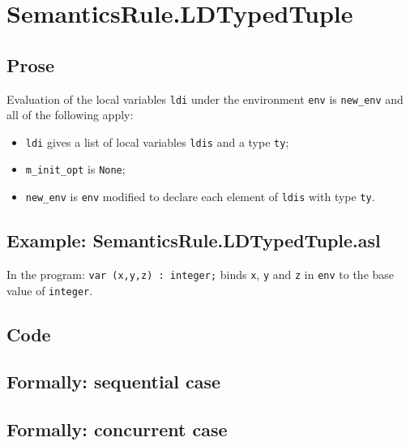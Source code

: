 \documentclass{book}
\begin{document}

\section{SemanticsRule.LDTypedTuple \label{sec:SemanticsRule.LDTypedTuple}}

    \subsection{Prose}
Evaluation of the local variables \texttt{ldi} under the environment
\texttt{env} is \texttt{new\_env} and all of the following apply:
    \begin{itemize}
    \item \texttt{ldi} gives a list of local variables \texttt{ldis} and a type \texttt{ty};
    \item \texttt{m\_init\_opt} is \texttt{None};
    \item \texttt{new\_env} is \texttt{env} modified to declare each element of \texttt{ldis} with type \texttt{ty}.
    \end{itemize}

    \subsection{Example: SemanticsRule.LDTypedTuple.asl}
    In the program:
    \texttt{var (x,y,z) : integer;} binds \texttt{x}, \texttt{y} and \texttt{z} in \texttt{env} to the base value
    of \texttt{integer}.

  \subsection{Code}

\begin{emptyformal}
  \subsection{Formally: sequential case}

  \subsection{Formally: concurrent case}
\end{emptyformal}
\end{document}
